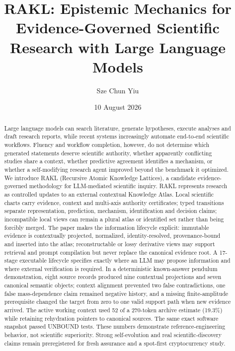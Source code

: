 \documentclass[11pt]{article}
\title{RAKL: Epistemic Mechanics for Evidence-Governed Scientific Research with Large Language Models}
\author{Sze Chun Yiu}
\date{10 August 2026}
\newcommand{\RAKL}{\textsc{RAKL}}
\newcommand{\SoftwareTests}{UNBOUND}%
\begin{document}
\maketitle

\begin{abstract}
Large language models can search literature, generate hypotheses, execute analyses and draft research reports, while recent systems increasingly automate end-to-end scientific workflows. Fluency and workflow completion, however, do not determine which generated statements deserve scientific authority, whether apparently conflicting studies share a context, whether predictive agreement identifies a mechanism, or whether a self-modifying research agent improved beyond the benchmark it optimized. We introduce \RAKL{} (Recursive Atomic Knowledge Lattices), a candidate evidence-governed methodology for LLM-mediated scientific inquiry. \RAKL{} represents research as controlled updates to an external contextual Knowledge Atlas. Local scientific charts carry evidence, context and multi-axis authority certificates; typed transitions separate representation, prediction, mechanism, identification and decision claims; incompatible local views can remain a plural atlas or identified set rather than being forcibly merged. The paper makes the information lifecycle explicit: immutable evidence is contextually projected, normalized, identity-resolved, provenance-bound and inserted into the atlas; reconstructable or lossy derivative views may support retrieval and prompt compilation but never replace the canonical evidence root. A 17-stage executable lifecycle specifies exactly where an LLM may propose information and where external verification is required. In a deterministic known-answer pendulum demonstration, eight source records produced nine contextual projections and seven canonical semantic objects; context alignment prevented two false contradictions, one false mass-dependence claim remained negative history, and a missing finite-amplitude prerequisite changed the target from zero to one valid support path when new evidence arrived. The active working context used 52 of a 270-token archive estimate (19.3\%) while retaining rehydration pointers to canonical sources. The same exact software snapshot passed \SoftwareTests{} tests. These numbers demonstrate reference-engineering behavior, not scientific superiority. Strong self-evolution and real scientific-discovery claims remain preregistered for fresh assurance and a spot-first cryptocurrency study.
\end{abstract}
\end{document}
